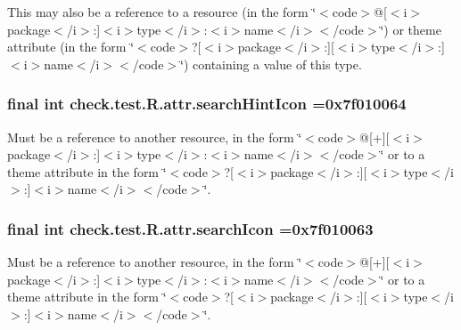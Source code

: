 This may also be a reference to a resource (in the form \char`\"{}$<$code$>$@\mbox{[}$<$i$>$package$<$/i$>$\+:\mbox{]}$<$i$>$type$<$/i$>$\+:$<$i$>$name$<$/i$>$$<$/code$>$\char`\"{}) or theme attribute (in the form \char`\"{}$<$code$>$?\mbox{[}$<$i$>$package$<$/i$>$\+:\mbox{]}\mbox{[}$<$i$>$type$<$/i$>$\+:\mbox{]}$<$i$>$name$<$/i$>$$<$/code$>$\char`\"{}) containing a value of this type. \hypertarget{classcheck_1_1test_1_1_r_1_1attr_aed7f407928079e9b1f426217289de596}{}
\subsubsection[{search\+Hint\+Icon}]{\setlength{\rightskip}{0pt plus 5cm}final int check.\+test.\+R.\+attr.\+search\+Hint\+Icon =0x7f010064\hspace{0.3cm}{\ttfamily [static]}}\label{classcheck_1_1test_1_1_r_1_1attr_aed7f407928079e9b1f426217289de596}
Must be a reference to another resource, in the form \char`\"{}$<$code$>$@\mbox{[}+\mbox{]}\mbox{[}$<$i$>$package$<$/i$>$\+:\mbox{]}$<$i$>$type$<$/i$>$\+:$<$i$>$name$<$/i$>$$<$/code$>$\char`\"{} or to a theme attribute in the form \char`\"{}$<$code$>$?\mbox{[}$<$i$>$package$<$/i$>$\+:\mbox{]}\mbox{[}$<$i$>$type$<$/i$>$\+:\mbox{]}$<$i$>$name$<$/i$>$$<$/code$>$\char`\"{}. \hypertarget{classcheck_1_1test_1_1_r_1_1attr_a717dce7ca09db8fdf5d59a56a1a70ee0}{}
\subsubsection[{search\+Icon}]{\setlength{\rightskip}{0pt plus 5cm}final int check.\+test.\+R.\+attr.\+search\+Icon =0x7f010063\hspace{0.3cm}{\ttfamily [static]}}\label{classcheck_1_1test_1_1_r_1_1attr_a717dce7ca09db8fdf5d59a56a1a70ee0}
Must be a reference to another resource, in the form \char`\"{}$<$code$>$@\mbox{[}+\mbox{]}\mbox{[}$<$i$>$package$<$/i$>$\+:\mbox{]}$<$i$>$type$<$/i$>$\+:$<$i$>$name$<$/i$>$$<$/code$>$\char`\"{} or to a theme attribute in the form \char`\"{}$<$code$>$?\mbox{[}$<$i$>$package$<$/i$>$\+:\mbox{]}\mbox{[}$<$i$>$type$<$/i$>$\+:\mbox{]}$<$i$>$name$<$/i$>$$<$/code$>$\char`\"{}. \hypertarget{classcheck_1_1test_1_1_r_1_1attr_a8569118fa0ad9dc50ad2d3035e843862}{}
